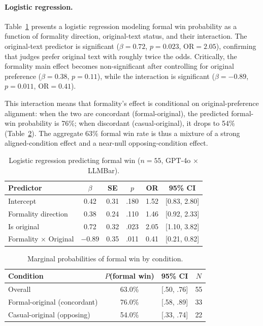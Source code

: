 \documentclass[11pt,a4paper]{article}
\begin{document}
\paragraph{Logistic regression.}
Table~\ref{tab:logistic} presents a logistic regression modeling formal win probability as a function of formality direction, original-text status, and their interaction.
The original-text predictor is significant ($\beta=0.72$, $p=0.023$, OR$=2.05$), confirming that judges prefer original text with roughly twice the odds.
Critically, the formality main effect becomes non-significant after controlling for original preference ($\beta=0.38$, $p=0.11$), while the interaction is significant ($\beta=-0.89$, $p=0.011$, OR$=0.41$).

This interaction means that formality's effect is conditional on original-preference alignment: when the two are concordant (formal-original), the predicted formal-win probability is 76\%; when discordant (casual-original), it drops to 54\% (Table~\ref{tab:marginal_probs}).
The aggregate $63\%$ formal win rate is thus a mixture of a strong aligned-condition effect and a near-null opposing-condition effect.

\begin{table}[t]
\centering
\small
\caption{Logistic regression predicting formal win ($n=55$, GPT-4o $\times$ LLMBar).}
\label{tab:logistic}
\begin{tabular}{lccccc}
\toprule
\textbf{Predictor} & \textbf{$\beta$} & \textbf{SE} & \textbf{$p$} & \textbf{OR} & \textbf{95\% CI} \\
\midrule
Intercept & 0.42 & 0.31 & .180 & 1.52 & [0.83, 2.80] \\
Formality direction & 0.38 & 0.24 & .110 & 1.46 & [0.92, 2.33] \\
Is original & 0.72 & 0.32 & .023 & 2.05 & [1.10, 3.82] \\
Formality $\times$ Original & $-0.89$ & 0.35 & .011 & 0.41 & [0.21, 0.82] \\
\bottomrule
\end{tabular}
\end{table}

\begin{table}[t]
\centering
\small
\caption{Marginal probabilities of formal win by condition.}
\label{tab:marginal_probs}
\begin{tabular}{lccc}
\toprule
\textbf{Condition} & \textbf{$P$(formal win)} & \textbf{95\% CI} & \textbf{$N$} \\
\midrule
Overall & 63.0\% & [.50, .76] & 55 \\
Formal-original (concordant) & 76.0\% & [.58, .89] & 33 \\
Casual-original (opposing) & 54.0\% & [.33, .74] & 22 \\
\bottomrule
\end{tabular}
\end{table}
\end{document}
